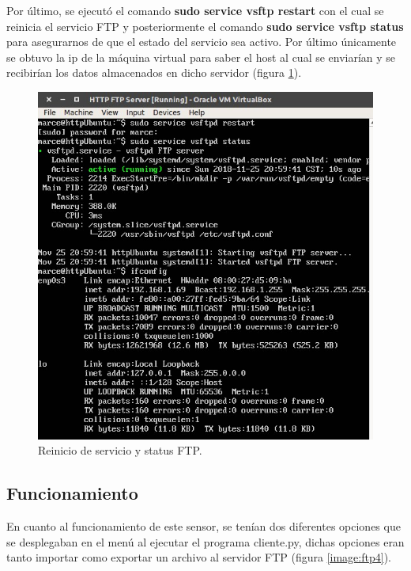 Por último, se ejecutó el comando \textbf{sudo service vsftp restart} con el cual se reinicia el servicio FTP y posteriormente el comando \textbf{sudo service vsftp status} para asegurarnos de que el estado del servicio sea activo. Por último únicamente se obtuvo la ip de la máquina virtual para saber el host al cual se enviarían y se recibirían los datos almacenados en dicho servidor (figura \ref{image:ftp3}).

\FloatBarrier
\begin{figure}[htbp!]
		\centering
			\includegraphics[width=.75 \textwidth]{images/ftp3}
		\caption{Reinicio de servicio y status FTP.}
		\label{image:ftp3}
\end{figure}
\FloatBarrier
\subsection{Funcionamiento}
En cuanto al funcionamiento de este sensor, se tenían dos diferentes opciones que se desplegaban en el menú al ejecutar el programa cliente.py, dichas opciones eran tanto importar como exportar un archivo al servidor FTP (figura \ref{image:ftp4}).

